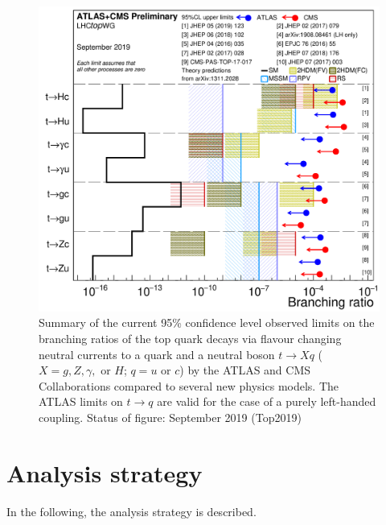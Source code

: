 \begin{figure}[htb]
	\centering
	\includegraphics[scale=0.15]{Chapters/CH5/figures/fcnc_summarybsm}
	\caption{Summary of the current 95\% confidence level observed limits on the branching ratios of the top quark decays via flavour changing neutral currents to a quark and a neutral boson $t\rightarrow Xq$ ($X = g, Z, \gamma,$ or $H$; $q = u$ or $c$) by the ATLAS and CMS Collaborations compared to several new physics models. The ATLAS limits on $t \rightarrow q$ are valid for the case of a purely left-handed coupling. Status of figure: September 2019 (Top2019)}
	\label{fig:intro:limits}
\end{figure}

\clearpage
\section{Analysis strategy}
In the following, the analysis strategy is described.

